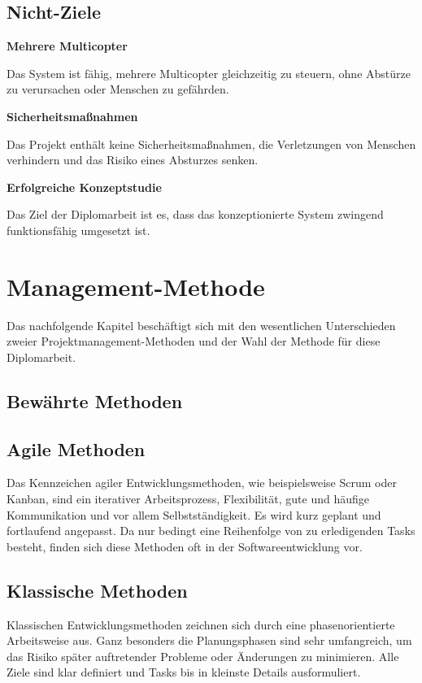   \subsection{Nicht-Ziele}
  \textbf{Mehrere Multicopter}

  Das System ist fähig, mehrere Multicopter gleichzeitig zu steuern, ohne Abstürze
  zu verursachen oder Menschen zu gefährden.

  \textbf{Sicherheitsmaßnahmen}

  Das Projekt enthält keine Sicherheitsmaßnahmen, die Verletzungen von Menschen
  verhindern und das Risiko eines Absturzes senken.

  \textbf{Erfolgreiche Konzeptstudie}

  Das Ziel der Diplomarbeit ist es, dass das konzeptionierte System zwingend
  funktionsfähig umgesetzt ist.

\section{Management-Methode}
Das nachfolgende Kapitel beschäftigt sich mit den wesentlichen Unterschieden
zweier Projektmanagement-Methoden und der Wahl der Methode für diese Diplomarbeit.

  \subsection{Bewährte Methoden}
  \subsection*{Agile Methoden}
  Das Kennzeichen agiler Entwicklungsmethoden, wie beispielsweise Scrum oder Kanban, sind
  ein iterativer Arbeitsprozess, Flexibilität, gute und häufige Kommunikation und vor allem
  Selbstständigkeit. Es wird kurz geplant und fortlaufend angepasst. Da nur bedingt eine Reihenfolge
  von zu erledigenden Tasks besteht, finden sich diese Methoden oft in der Softwareentwicklung vor.

  \subsection*{Klassische Methoden}
  Klassischen Entwicklungsmethoden zeichnen sich durch eine phasenorientierte Arbeitsweise aus.
  Ganz besonders die Planungsphasen sind sehr umfangreich, um das Risiko später auftretender Probleme oder
  Änderungen zu minimieren. Alle Ziele sind klar definiert und Tasks bis in kleinste Details ausformuliert.

